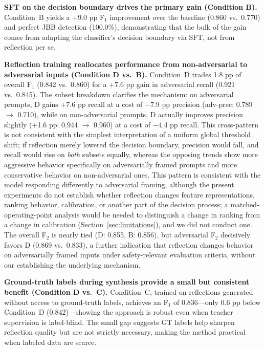 \documentclass[superintelligence,article,accept,moreauthors]{Definitions/mdpi}
\begin{document}
\textbf{SFT on the decision boundary drives the primary gain (Condition B).}
Condition~B yields a +9.0 pp F$_1$ improvement over the baseline (0.860 vs.\ 0.770) and perfect JBB detection (100.0\%), demonstrating that the bulk of the gain comes from adapting the classifier's decision boundary via SFT, not from reflection per se.

\textbf{Reflection training reallocates performance from non-adversarial to adversarial inputs (Condition D vs.\ B).}
Condition~D trades 1.8 pp of overall F$_1$ (0.842 vs.\ 0.860) for a +7.6 pp gain in adversarial recall (0.921 vs.\ 0.845). The subset breakdown clarifies the mechanism: on adversarial prompts, D gains +7.6 pp recall at a cost of $-$7.9 pp precision (adv-prec: 0.789 $\to$ 0.710), while on non-adversarial prompts, D actually improves precision slightly ($+$1.6 pp: 0.944 $\to$ 0.960) at a cost of $-$4.4 pp recall. This cross-pattern is not consistent with the simplest interpretation of a uniform global threshold shift; if reflection merely lowered the decision boundary, precision would fall, and recall would rise on \emph{both} subsets equally, whereas the opposing trends show more aggressive behavior specifically on adversarially framed prompts and more conservative behavior on non-adversarial ones. This pattern is consistent with the model responding differently to adversarial framing, although the present experiments do not establish whether reflection changes feature representations, ranking behavior, calibration, or another part of the decision process; a matched-operating-point analysis would be needed to distinguish a change in ranking from a change in calibration (Section~\ref{sec:limitations}), and we did not conduct one. The overall F$_2$ is nearly tied (D: 0.855, B: 0.856), but adversarial F$_2$ decisively favors D (0.869 vs.\ 0.833), a further indication that reflection changes behavior on adversarially framed inputs under safety-relevant evaluation criteria, without our establishing the underlying mechanism.

\textbf{Ground-truth labels during synthesis provide a small but consistent benefit (Condition D vs.\ C).}
Condition~C, trained on reflections generated without access to ground-truth labels, achieves an F$_1$ of 0.836---only 0.6 pp below Condition~D (0.842)---showing the approach is robust even when teacher supervision is label-blind. The small gap suggests GT labels help sharpen reflection quality but are not strictly necessary, making the method practical when labeled data are scarce.
\end{document}
